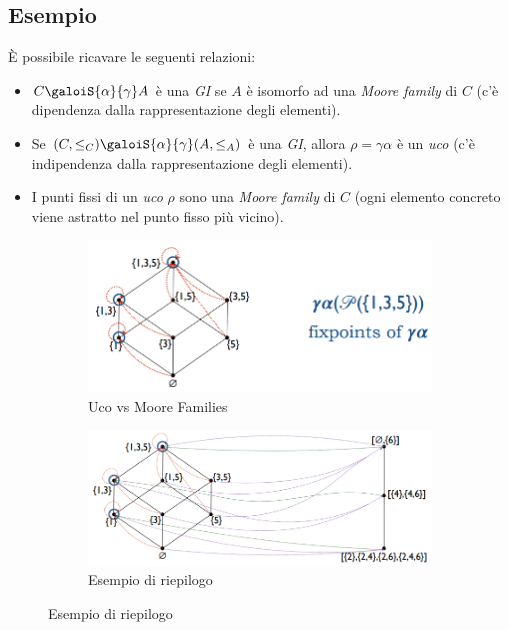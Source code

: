 \documentclass[a4paper,oneside,titlepage]{book}
\begin{document}
\subsection{Esempio}
\`{E} possibile ricavare le seguenti relazioni:
\begin{itemize}
    \item $C \galoiS{\alpha}{\gamma} A$ è una \textit{GI} se $A$ è isomorfo ad una \textit{Moore family} di $C$ (c'è dipendenza dalla rappresentazione degli elementi).
    \item Se $(C, \leq_C) \galoiS{\alpha}{\gamma} (A, \leq_A)$ è una \textit{GI}, allora $\rho = \gamma \alpha$ è un \textit{uco} (c'è indipendenza dalla rappresentazione degli elementi).
    \item I punti fissi di un \textit{uco} $\rho$ sono una \textit{Moore family} di $C$ (ogni elemento concreto viene astratto nel punto fisso più vicino).
\end{itemize}
\begin{figure}[htp]
	\begin{subfigure}{0.49\textwidth}
	    \centering
		\includegraphics[width=\textwidth, height=\textheight, keepaspectratio]{UCOvsMF.png}
		\caption{Uco vs Moore Families}
	\end{subfigure}
	\hfill
	\begin{subfigure}{0.49\textwidth}
	    \centering
		\includegraphics[width=\textwidth, height=\textheight, keepaspectratio]{all.png} 
		\caption{Esempio di riepilogo}
	\end{subfigure}
\end{figure}
\end{document}
